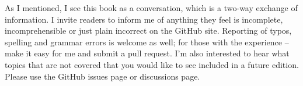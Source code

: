  As I mentioned, I see this book as a conversation, which is a two-way exchange of information. I invite readers to inform me of anything they feel is incomplete, incomprehensible or just plain incorrect on the GitHub site. Reporting of typos, spelling and grammar errors is welcome as well; for those with the experience – make it easy for me and submit a pull request. I’m also interested to hear what topics that are not covered that you would like to see included in a future edition. Please use the GitHub issues page or discussions page. 
